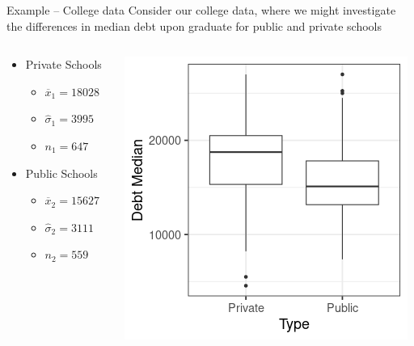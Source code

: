 \documentclass{beamer}
\begin{document}
\begin{frame}{Example -- College data}
Consider our college data, where we might investigate the differences in median debt upon graduate for public and private schools



\begin{columns}

  \begin{column}{0.45\textwidth}
\begin{itemize}
\item Private Schools
\begin{itemize}
\item $\overline{x}_1 = 18028$
\item $\hat{\sigma}_1 = 3995$
\item $n_1 = 647$
\end{itemize}
\item Public Schools
\begin{itemize}
\item $\overline{x}_2 = 15627$
\item $\hat{\sigma}_2 = 3111$
\item $n_2 = 559$
\end{itemize}
\end{itemize}
  \end{column}
  \begin{column}{0.5\textwidth}
\begin{center}
\includegraphics[scale=0.5]{debt_plot.png}
\end{center}
  \end{column}
\end{columns}
\end{frame}
\end{document}
